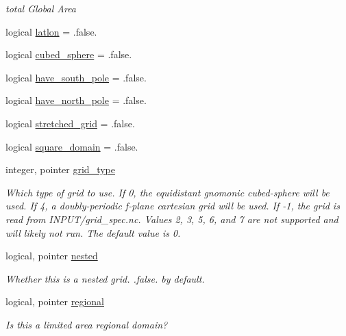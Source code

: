 \begin{DoxyCompactItemize}
\begin{DoxyCompactList}\small\item\em total Global Area \end{DoxyCompactList}\item 
logical \hyperlink{structfv__arrays__mod_1_1fv__grid__type_a0bcbdca269b5eb7ccafac2510dc19ca3}{latlon} = .false.
\item 
logical \hyperlink{structfv__arrays__mod_1_1fv__grid__type_aa17b47beeccc44f1126d9fb059a13b12}{cubed\-\_\-sphere} = .false.
\item 
logical \hyperlink{structfv__arrays__mod_1_1fv__grid__type_a9ff792f4824941c92d1067e336340dc9}{have\-\_\-south\-\_\-pole} = .false.
\item 
logical \hyperlink{structfv__arrays__mod_1_1fv__grid__type_a4da13b90d87079e3111543e5748ce794}{have\-\_\-north\-\_\-pole} = .false.
\item 
logical \hyperlink{structfv__arrays__mod_1_1fv__grid__type_a59134caa7da3ff6f21dc66d5cf24f6ee}{stretched\-\_\-grid} = .false.
\item 
logical \hyperlink{structfv__arrays__mod_1_1fv__grid__type_a95f5486b00cce83c0bf3896ef9906394}{square\-\_\-domain} = .false.
\item 
integer, pointer \hyperlink{structfv__arrays__mod_1_1fv__grid__type_a1eb07208e873e6b397c781fe6147a083}{grid\-\_\-type}
\begin{DoxyCompactList}\small\item\em Which type of grid to use. If 0, the equidistant gnomonic cubed-\/sphere will be used. If 4, a doubly-\/periodic f-\/plane cartesian grid will be used. If -\/1, the grid is read from I\-N\-P\-U\-T/grid\-\_\-spec.\-nc. Values 2, 3, 5, 6, and 7 are not supported and will likely not run. The default value is 0. \end{DoxyCompactList}\item 
logical, pointer \hyperlink{structfv__arrays__mod_1_1fv__grid__type_a9c18fd545272f0034353dbe2a65c2b67}{nested}
\begin{DoxyCompactList}\small\item\em Whether this is a nested grid. .false. by default. \end{DoxyCompactList}\item 
logical, pointer \hyperlink{structfv__arrays__mod_1_1fv__grid__type_adcad0a9addae92a376815619846cac3b}{regional}
\begin{DoxyCompactList}\small\item\em Is this a limited area regional domain? \end{DoxyCompactList}\end{DoxyCompactItemize}


